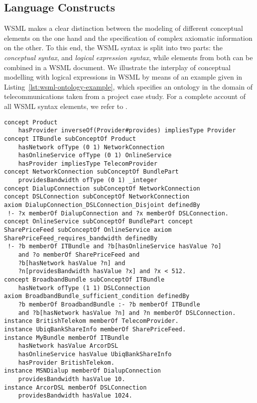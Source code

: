 \subsection{Language Constructs}
WSML makes a clear distinction between the modeling of different
conceptual elements on the one hand and the specification of complex
axiomatic information on the other. To this end, the WSML syntax is
split into two parts: the \emph{conceptual syntax},  and
\emph{logical expression syntax}, while elements from both can be
combined in a WSML document. We illustrate the interplay of
conceptual modelling with logical expressions in WSML by means of an
example given in Listing~\ref{lst:wsml-ontology-example}, which
specifies an ontology in the domain of telecommunications taken from
a project case study. For a complete account of all WSML syntax
elements, we refer to \cite{wsml-spec}.
\begin{lstlisting}[label=lst:wsml-ontology-example,style=wsml, caption=WSML Example Ontology]
concept Product
    hasProvider inverseOf(Provider#provides) impliesType Provider
concept ITBundle subConceptOf Product
    hasNetwork ofType (0 1) NetworkConnection
    hasOnlineService ofType (0 1) OnlineService
    hasProvider impliesType TelecomProvider
concept NetworkConnection subConceptOf BundlePart
    providesBandwidth ofType (0 1) _integer
concept DialupConnection subConceptOf NetworkConnection
concept DSLConnection subConceptOf NetworkConnection
axiom DialupConnection_DSLConnection_Disjoint definedBy
 !- ?x memberOf DialupConnection and ?x memberOf DSLConnection.
concept OnlineService subConceptOf BundlePart concept
SharePriceFeed subConceptOf OnlineService axiom
SharePriceFeed_requires_bandwidth definedBy
 !- ?b memberOf ITBundle and ?b[hasOnlineService hasValue ?o]
    and ?o memberOf SharePriceFeed and
    ?b[hasNetwork hasValue ?n] and
    ?n[providesBandwidth hasValue ?x] and ?x < 512.
concept BroadbandBundle subConceptOf ITBundle
    hasNetwork ofType (1 1) DSLConnection
axiom BroadbandBundle_sufficient_condition definedBy
    ?b memberOf BroadbandBundle :- ?b memberOf ITBundle
    and ?b[hasNetwork hasValue ?n] and ?n memberOf DSLConnection.
instance BritishTelekom memberOf TelecomProvider.
instance UbiqBankShareInfo memberOf SharePriceFeed.
instance MyBundle memberOf ITBundle
    hasNetwork hasValue ArcorDSL
    hasOnlineService hasValue UbiqBankShareInfo
    hasProvider BritishTelekom.
instance MSNDialup memberOf DialupConnection
    providesBandwidth hasValue 10.
instance ArcorDSL memberOf DSLConnection
    providesBandwidth hasValue 1024.
\end{lstlisting}

